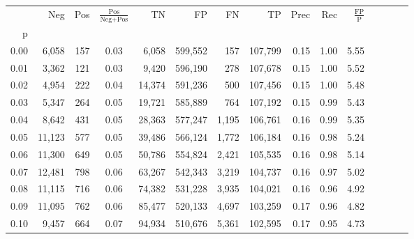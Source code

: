 \begin{tabular}{rrrcrrrrrrrrrrr}
\toprule
{} &     Neg &    Pos & $\frac{\text{Pos}}{\text{Neg}+\text{Pos}}$ &       TN &       FP &       FN &       TP &  Prec &   Rec & $\frac{\text{FP}}{\text{P}}$ \\
p    &         &        &                                            &          &          &          &          &       &       &                              \\
\midrule
0.00 &   6,058 &    157 &                                       0.03 &    6,058 &  599,552 &      157 &  107,799 &  0.15 &  1.00 &                         5.55 \\
0.01 &   3,362 &    121 &                                       0.03 &    9,420 &  596,190 &      278 &  107,678 &  0.15 &  1.00 &                         5.52 \\
0.02 &   4,954 &    222 &                                       0.04 &   14,374 &  591,236 &      500 &  107,456 &  0.15 &  1.00 &                         5.48 \\
0.03 &   5,347 &    264 &                                       0.05 &   19,721 &  585,889 &      764 &  107,192 &  0.15 &  0.99 &                         5.43 \\
0.04 &   8,642 &    431 &                                       0.05 &   28,363 &  577,247 &    1,195 &  106,761 &  0.16 &  0.99 &                         5.35 \\
0.05 &  11,123 &    577 &                                       0.05 &   39,486 &  566,124 &    1,772 &  106,184 &  0.16 &  0.98 &                         5.24 \\
0.06 &  11,300 &    649 &                                       0.05 &   50,786 &  554,824 &    2,421 &  105,535 &  0.16 &  0.98 &                         5.14 \\
0.07 &  12,481 &    798 &                                       0.06 &   63,267 &  542,343 &    3,219 &  104,737 &  0.16 &  0.97 &                         5.02 \\
0.08 &  11,115 &    716 &                                       0.06 &   74,382 &  531,228 &    3,935 &  104,021 &  0.16 &  0.96 &                         4.92 \\
0.09 &  11,095 &    762 &                                       0.06 &   85,477 &  520,133 &    4,697 &  103,259 &  0.17 &  0.96 &                         4.82 \\
0.10 &   9,457 &    664 &                                       0.07 &   94,934 &  510,676 &    5,361 &  102,595 &  0.17 &  0.95 &                         4.73 \\

\end{tabular}
